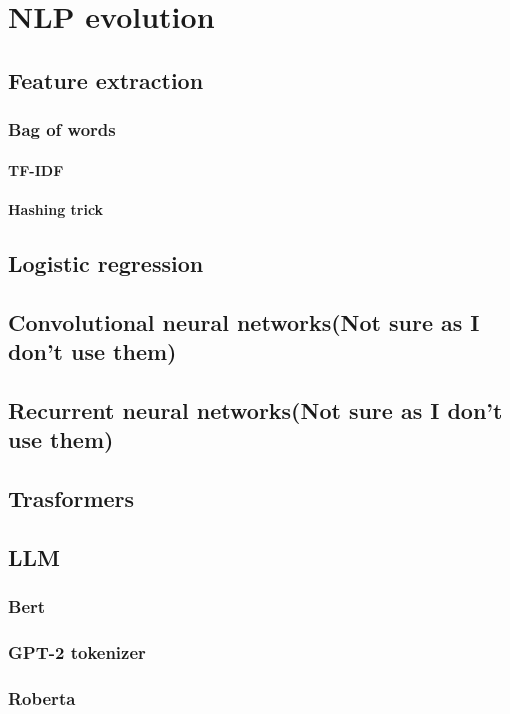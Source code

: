 \chapter{NLP evolution}

\section{Feature extraction}
\subsection{Bag of words}
\subsubsection{TF-IDF}
\subsubsection{Hashing trick}

\section{Logistic regression}

\section{Convolutional neural networks(Not sure as I don't use them)}

\section{Recurrent neural networks(Not sure as I don't use them)}

\section{Trasformers}

\section{LLM}
\subsection{Bert}
\subsection{GPT-2 tokenizer}
\subsection{Roberta}
